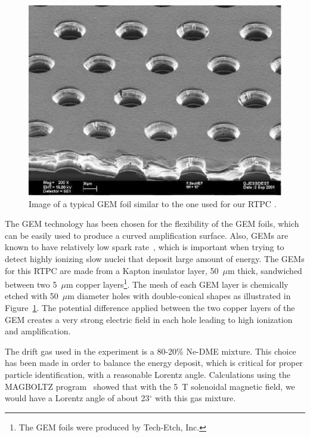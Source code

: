 \documentclass[preprint,5p]{elsarticle}
\begin{document}
\begin{figure}[tbp]
\centering
\includegraphics[scale=0.70]{GEM_photo.jpg}
\caption{Image of a typical GEM foil similar to the one used for our RTPC 
\cite{Sauli:2016eeu}.} 
   \label{fig:GEMs}
\end{figure}

The GEM technology has been chosen for the flexibility of the GEM foils,
which can be easily used to produce a curved amplification surface. Also, GEMs 
are known to have relatively low spark rate~\cite{Bachmann:2000kj}, which is 
important when trying to detect highly ionizing slow nuclei that deposit large 
amount of energy. The GEMs for this RTPC are made from a Kapton insulator 
layer, 50~$\mu$m thick, sandwiched between two 5~$\mu$m copper 
layers\footnote{The GEM foils were produced by Tech-Etch, Inc.}. The mesh of 
each GEM layer is chemically etched with 50~$\mu$m diameter holes with 
double-conical shapes as illustrated in Figure~\ref{fig:GEMs}. The potential 
difference applied between the two copper layers of the GEM creates a very 
strong electric field in each hole leading to high ionization and 
amplification. 

The drift gas used in the experiment is a 80-20\% Ne-DME mixture. This choice 
has been made in order to balance the energy deposit, which is critical
for proper particle identification, with a reasonable
Lorentz angle. Calculations using the MAGBOLTZ program~\cite{Biagi:1999nwa} 
showed that with the 5~T solenoidal magnetic field, we would have a Lorentz 
angle of about 23$^\circ$ with this gas mixture.
\end{document}
